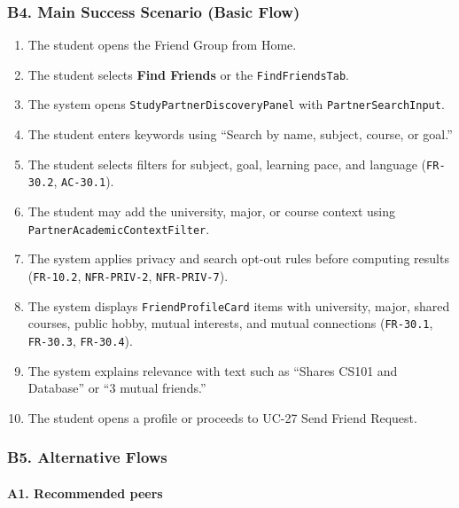 \documentclass[12pt]{article}
\begin{document}
\hypertarget{sec:b4-main-success-scenario-basic-flow}{}
\subsubsection*{B4. Main Success Scenario (Basic Flow)}
\par\medskip

\begin{enumerate}
\item The student opens the Friend Group from Home.
\item The student selects \textbf{Find Friends} or the \texttt{FindFriendsTab}.
\item The system opens \texttt{StudyPartnerDiscoveryPanel} with \texttt{PartnerSearchInput}.
\item The student enters keywords using “Search by name, subject, course, or goal.”
\item The student selects filters for subject, goal, learning pace, and language (\texttt{FR-30.2}, \texttt{AC-30.1}).
\item The student may add the university, major, or course context using \texttt{PartnerAcademicContextFilter}.
\item The system applies privacy and search opt-out rules before computing results (\texttt{FR-10.2}, \texttt{NFR-PRIV-2}, \texttt{NFR-PRIV-7}).
\item The system displays \texttt{FriendProfileCard} items with university, major, shared courses, public hobby, mutual interests, and mutual connections (\texttt{FR-30.1}, \texttt{FR-30.3}, \texttt{FR-30.4}).
\item The system explains relevance with text such as “Shares CS101 and Database” or “3 mutual friends.”
\item The student opens a profile or proceeds to UC-27 Send Friend Request.
\end{enumerate}
\par\medskip

\hypertarget{sec:b5-alternative-flows}{}
\subsubsection*{B5. Alternative Flows}
\par\medskip

\hypertarget{sec:a1-recommended-peers}{}
\paragraph*{A1. Recommended peers}
\par\medskip
\end{document}
